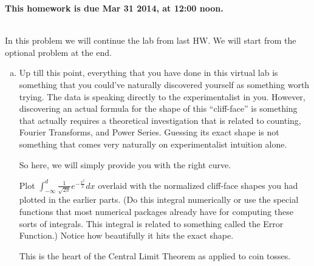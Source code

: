 \documentclass[]{article}
\newif\ifsolutions
\renewcommand{\answer}[1]{{\color{mydarkblue}\textbf{Solution:}#1}}
\begin{document}
\maketitle
{}
\vspace{0.5em}
{\Large{\textbf{This homework is due Mar 31 2014, at 12:00 noon.}}}

\begin{qunlist}
  
\\    
In this problem we will continue the lab from last HW. We will start from the optional problem at the end.
\begin{enumerate}[a)]


\qpart 
\item  Up till this point, everything that
  you have done in this virtual lab is something that you could've
  naturally discovered yourself as something worth trying. The data is
  speaking directly to the experimentalist in you. However,
  discovering an actual formula for the shape of this ``cliff-face'' is
  something that actually requires a theoretical investigation that is
  related to counting, Fourier Transforms, and Power Series. Guessing
  its exact shape is not something that comes very naturally on
  experimentalist intuition alone.

  So here, we will simply provide you with the right curve.

  Plot $\int_{-\infty}^d\frac{1}{\sqrt{2\pi}} e^{-\frac{x^2}{2}}dx$
  overlaid with the normalized cliff-face shapes you had plotted in
  the earlier parts. (Do this integral numerically or use the special
  functions that most numerical packages already have for computing
  these sorts of integrals. This integral is related to something
  called the Error Function.) Notice how beautifully it hits the exact
  shape. 

  This is the heart of the Central Limit Theorem as applied to coin
  tosses.

\ifsolutions{ \answer {
We can see that the theoretical curve fits the shape perfectly for different $p$ values. And the zigzags smooth out as $k$ increases.
\begin{figure}[h!]
\center
\texttt{[image: figures/part\_a.png]}
\end{figure}

}}\fi


\newpage
 

\end{enumerate}
\end{qunlist}
\end{document}
